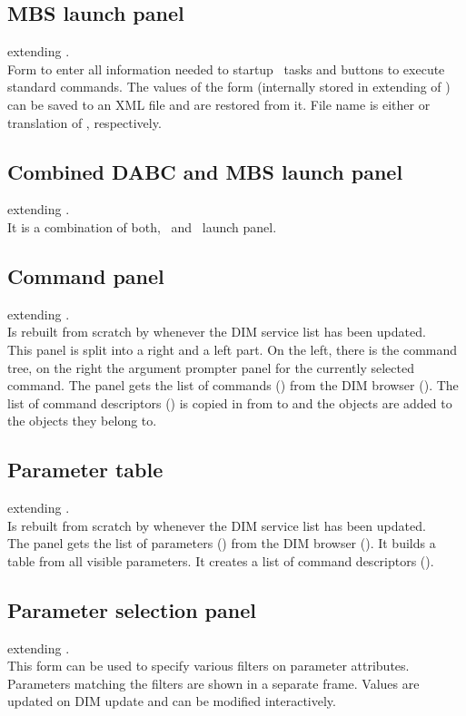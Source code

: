 \subsection{MBS launch panel}
 extending .\\
Form to enter all information needed to startup \mbs\ tasks and
buttons to execute standard commands.
The values of the form (internally stored in  extending of )
can be saved to an XML file and are restored from it. File name is either
 or translation of , respectively.
\subsection{Combined DABC and MBS launch panel}
 extending .\\
It is a combination of both, \dabc\ and \mbs\ launch panel.
\subsection{Command panel}
 extending .\\
Is rebuilt from scratch by  whenever the DIM service list has been updated.\\
This panel is split into a right and a left part. On the left, there is the command tree,
on the right the argument prompter panel for the currently selected command.
The panel gets the list of commands () from the DIM browser ().
The list of command descriptors () is copied in  from  to
 and the  objects are added to the
 objects they belong to.
\subsection{Parameter table}
 extending .\\
Is rebuilt from scratch by  whenever the DIM service list has been updated.\\
The panel gets the list of parameters () from the DIM browser (). It builds a table from all visible parameters.
It creates a list of command descriptors ().
\subsection{Parameter selection panel}
 extending .\\
This form can be used to specify various filters on parameter attributes.
Parameters matching the filters are shown in a separate frame. Values
are updated on DIM update and can be modified interactively.
